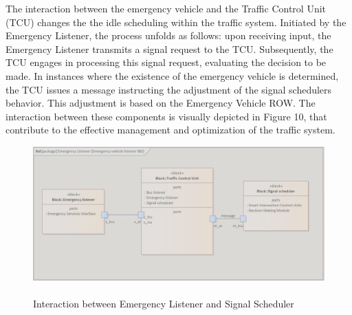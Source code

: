 The interaction between the emergency vehicle and the Traffic Control Unit (TCU) changes the the idle scheduling within the traffic system. Initiated by the Emergency Listener, the process unfolds as follows: upon receiving input, the Emergency Listener transmits a signal request to the TCU. Subsequently, the TCU engages in processing this signal request, evaluating the decision to be made.
In instances where the existence of the emergency vehicle is determined, the TCU issues a message instructing the adjustment of the signal schedulers behavior. This adjustment is based on the Emergency Vehicle ROW. The interaction between these components is visually depicted in  Figure 10, that contribute to the effective management and optimization of the traffic system.
\begin{figure}[h]
\centering
\includegraphics[width=1\linewidth]{images/emergency_listener_ibd.png}
\caption{\label{fig:bus_listeneribd}\\Interaction between Emergency Listener and Signal Scheduler}
\end{figure}